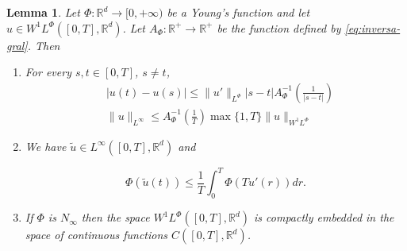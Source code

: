 \documentclass[twoside]{article}
\newtheorem{lem}[thm]{Lemma}
\theoremstyle{remark}
\newcommand{\orlnor}{\|_{L^{\Phi}}}
\newcommand{\linf}{\|_{L^{\infty}}}
\newcommand{\lphi}{L^{\Phi}}
\newcommand{\wphi}{W^{1}\lphi}
\newcommand{\sobnor}{\|_{W^{1}\lphi}}
\newcommand{\rr}{\mathbb{R}}
\renewcommand{\leq}{\leqslant}
\begin{document}
\begin{lem}\label{lem:inclusion orlicz} Let $\Phi:\rr^d\to [0,+\infty)$ be a Young's 
function and let $u\in\wphi\left([0,T],\rr^d\right)$. Let 
$A_{\Phi}: \rr^+ \to \rr^+$ be the function defined by \eqref{eq:inversa-gral}. Then
\begin{enumerate}
\item\label{inclusion orlicz_item1} For every $s,t\in [0,T]$, $s\neq t$,
\begin{align}
 &|u(t)-u(s)| \leq
 \|u'\orlnor |s-t|A_{\Phi}^{-1}\left(\frac{1}{|s-t|}\right)\tag{Morrey's inequality}\label{in-sob-cont}
\\
& \| u\linf \leq A_\Phi^{-1}\left(\frac{1}{T}\right)\max\{1,T\}\|u\sobnor\tag{Sobolev's inequality}\label{eq:sobolev}
\end{align}
\item We have $\widetilde{u}\in L^{\infty}\left([0,T],\rr^d\right)$ and 

\begin{equation}\label{eq:wirtinger}
  \Phi\left(\tilde{u}(t)\right)\leq\frac{1}{T} \int_0^T \Phi\left(Tu'(r)\right)dr.\tag{Poincar\'e-Wirtinger's inequality}
\end{equation}

\item\label{it:embeding} If $\Phi$ is $N_{\infty}$ then the space $\wphi\left([0,T],\rr^d\right)$ is compactly embedded in the space of  continuous functions $C([0,T],\rr^d)$.
\end{enumerate}
\end{lem}
\end{document}

